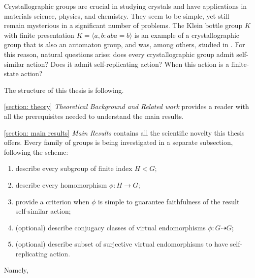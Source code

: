 \documentclass[a4paper,12pt]{amsart}
\theoremstyle{definition}
\begin{document}
	Crystallographic groups are crucial in studying crystals and have applications in materials science, physics, and chemistry. They seem to be simple, yet still remain mysterious in a significant number of problems. The Klein bottle group $K$ with finite presentation $K=\langle a,b : aba=b\rangle$ is an example of a crystallographic group that is also an automaton group, and was, among others, studied in \cite{Bond: classification_of_3state_automata_groups}. For this reason, natural questions arise: does every crystallographic group admit self-similar action? Does it admit self-replicating action? When this action is a finite-state action?
	
	The structure of this thesis is following. 
	
	\ref{section: theory} \textit{Theoretical Background and Related work} provides a reader with all the prerequisites needed to understand the main results.  
		
	\ref{section: main results} \textit{Main Results} contains all the scientific novelty this thesis offers. Every family of groups is being investigated in a separate subsection, following the scheme:
	
	\begin{enumerate}[label=\arabic*.]
		\item describe every subgroup of finite index $H < G$; 
		\item describe every homomorphism $\phi : H \rightarrow G$;
		\item provide a criterion when $\phi$ is simple to guarantee faithfulness of the result self-similar action;
		\item (optional) describe conjugacy classes of virtual endomorphisms $\phi: G \dashrightarrow G$;
		\item (optional) describe subset of surjective virtual endomorphisms to have self-replicating action.
	\end{enumerate}
	
	
	
	
	Namely, 
	
\end{document}
